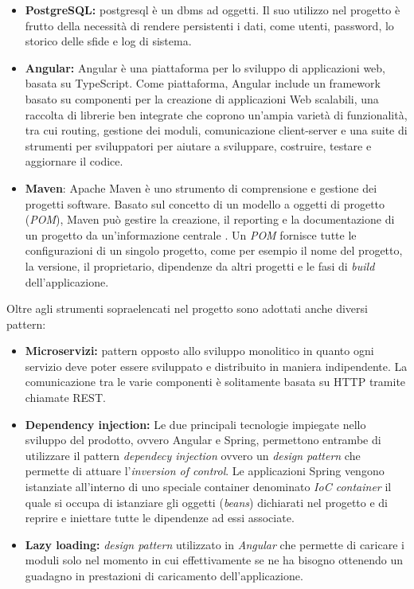 \begin{itemize}
    \item \textbf{PostgreSQL:} \Gls{postgresql} è un \acrshort{dbms} ad oggetti. Il suo utilizzo nel progetto è frutto della necessità di rendere persistenti i dati, come utenti, password, lo storico delle sfide e log di sistema.
    \item \textbf{Angular:} Angular è una piattaforma per lo sviluppo di applicazioni web, basata su TypeScript. Come piattaforma, Angular include un framework basato su componenti per la creazione di applicazioni Web scalabili, una raccolta di librerie ben integrate che coprono un'ampia varietà di funzionalità, tra cui routing, gestione dei moduli, comunicazione client-server e una suite di strumenti per sviluppatori per aiutare a sviluppare, costruire, testare e aggiornare il codice.\cite{angular}
    \item \textbf{Maven}: Apache Maven è uno strumento di comprensione e gestione dei progetti software. Basato sul concetto di un modello a oggetti di progetto (\textit{POM}), Maven può gestire la creazione, il reporting e la documentazione di un progetto da un'informazione centrale \cite{maven}. Un \textit{POM} fornisce tutte le configurazioni di un singolo progetto, come per esempio il nome del progetto, la versione, il proprietario, dipendenze da altri progetti e le fasi di \textit{build} dell'applicazione.
\end{itemize}

Oltre agli strumenti sopraelencati nel progetto sono adottati anche diversi \gls{pattern}:
\begin{itemize}
    \item \textbf{Microservizi:} pattern opposto allo sviluppo monolitico in quanto ogni servizio deve poter essere sviluppato e distribuito in maniera indipendente. La comunicazione tra le varie componenti è solitamente basata su HTTP tramite chiamate REST.
    \item \textbf{Dependency injection:} Le due principali tecnologie impiegate nello sviluppo del prodotto, ovvero Angular e Spring, permettono entrambe di utilizzare il pattern \textit{dependecy injection} ovvero un \textit{design pattern} che permette di attuare l’\textit{inversion of control}. Le applicazioni Spring vengono istanziate all’interno di uno speciale container denominato \textit{IoC container} il quale si occupa di istanziare gli oggetti (\textit{beans}) dichiarati nel progetto e di reprire e iniettare tutte le dipendenze ad essi associate.
    \item \textbf{Lazy loading:} \textit{design pattern} utilizzato in \textit{Angular} che permette di caricare i moduli solo nel momento in cui effettivamente se ne ha bisogno ottenendo un guadagno in prestazioni di caricamento dell'applicazione.
\end{itemize}